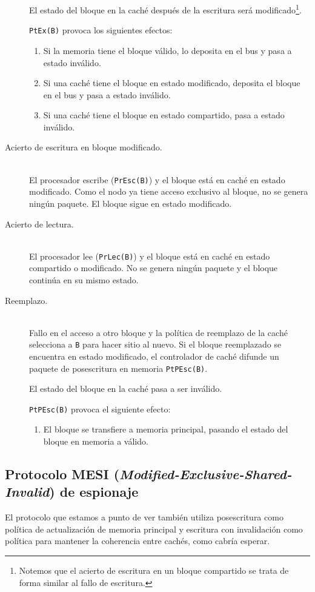 \begin{description}
    El estado del bloque en la caché después de la escritura será modificado\footnote{Notemos que el acierto de escritura en un bloque compartido se trata de forma similar al fallo de escritura.}.

    \verb|PtEx(B)| provoca los siguientes efectos:
    \begin{enumerate}
        \item Si la memoria tiene el bloque válido, lo deposita en el bus y pasa a estado inválido.
        \item Si una caché tiene el bloque en estado modificado, deposita el bloque en el bus y pasa a estado inválido.
        \item Si una caché tiene el bloque en estado compartido, pasa a estado inválido.
    \end{enumerate}
    \item [Acierto de escritura en bloque modificado.]~\\
        El procesador escribe (\verb|PrEsc(B)|) y el bloque está en caché en estado modificado. Como el nodo ya tiene acceso exclusivo al bloque, no se genera ningún paquete. El bloque sigue en estado modificado.
    \item [Acierto de lectura.]~\\
        El procesador lee (\verb|PrLec(B)|) y el bloque está en caché en estado compartido o modificado. No se genera ningún paquete y el bloque continúa en su mismo estado.
    \item [Reemplazo.]~\\
        Fallo en el acceso a otro bloque y la política de reemplazo de la caché selecciona a \verb|B| para hacer sitio al nuevo. Si el bloque reemplazado se encuentra en estado modificado, el controlador de caché difunde un paquete de posescritura en memoria \verb|PtPEsc(B)|. 

        El estado del bloque en la caché pasa a ser inválido.

        \verb|PtPEsc(B)| provoca el siguiente efecto:
        \begin{enumerate}
            \item El bloque se transfiere a memoria principal, pasando el estado del bloque en memoria a válido.
        \end{enumerate}
\end{description}

\subsection{Protocolo MESI (\emph{Modified-Exclusive-Shared-Invalid}) de espionaje}
El protocolo que estamos a punto de ver también utiliza posescritura como política de actualización de memoria principal y escritura con invalidación como política para mantener la coherencia entre cachés, como cabría esperar.

